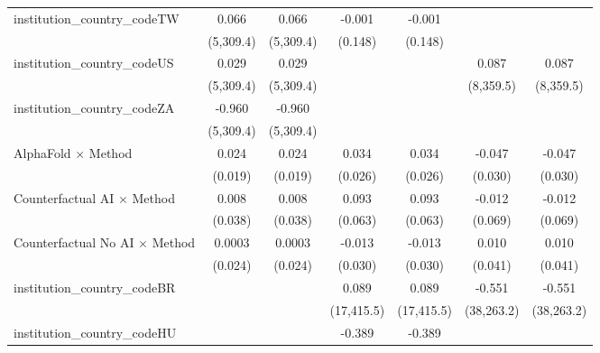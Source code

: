 \begin{tabular}{lcccccc}
   institution\_country\_codeTW          & 0.066         & 0.066         & -0.001         & -0.001         &                &   \\   
                                         & (5,309.4)     & (5,309.4)     & (0.148)        & (0.148)        &                &   \\   
   institution\_country\_codeUS          & 0.029         & 0.029         &                &                & 0.087          & 0.087\\   
                                         & (5,309.4)     & (5,309.4)     &                &                & (8,359.5)      & (8,359.5)\\   
   institution\_country\_codeZA          & -0.960        & -0.960        &                &                &                &   \\   
                                         & (5,309.4)     & (5,309.4)     &                &                &                &   \\   
   AlphaFold $\times$ Method             & 0.024         & 0.024         & 0.034          & 0.034          & -0.047         & -0.047\\   
                                         & (0.019)       & (0.019)       & (0.026)        & (0.026)        & (0.030)        & (0.030)\\   
   Counterfactual AI $\times$ Method     & 0.008         & 0.008         & 0.093          & 0.093          & -0.012         & -0.012\\   
                                         & (0.038)       & (0.038)       & (0.063)        & (0.063)        & (0.069)        & (0.069)\\   
   Counterfactual No AI $\times$ Method  & 0.0003        & 0.0003        & -0.013         & -0.013         & 0.010          & 0.010\\   
                                         & (0.024)       & (0.024)       & (0.030)        & (0.030)        & (0.041)        & (0.041)\\   
   institution\_country\_codeBR          &               &               & 0.089          & 0.089          & -0.551         & -0.551\\   
                                         &               &               & (17,415.5)     & (17,415.5)     & (38,263.2)     & (38,263.2)\\   
   institution\_country\_codeHU          &               &               & -0.389         & -0.389         &                &   \\   

\end{tabular}
